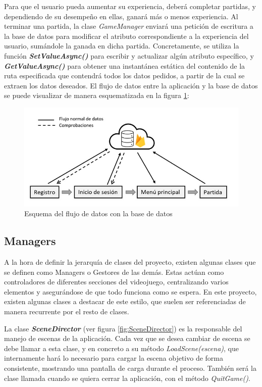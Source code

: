 Para que el usuario pueda aumentar su experiencia, deberá completar partidas, y dependiendo de su desempeño en ellas, ganará más o menos experiencia. Al terminar una partida, la clase \textit{GameManager} enviará una petición de escritura a la base de datos para modificar el atributo correspondiente a la experiencia del usuario, sumándole la ganada en dicha partida.
Concretamente, se utiliza la función \textbf{\textit{SetValueAsync()}} para escribir y actualizar algún atributo específico, y \textbf{\textit{GetValueAsync()}} para obtener una instantánea estática del contenido de la ruta especificada que contendrá todos los datos pedidos, a partir de la cual se extraen los datos deseados.
El flujo de datos entre la aplicación y la base de datos se puede visualizar de manera esquematizada en la figura \ref{fig:EsquemaBBDD}:
\begin{figure}[h]
	\centering
	\includegraphics[scale=0.45]{img/DataFlowDiagram.jpg}
	\caption{Esquema del flujo de datos con la base de datos}
	\label{fig:EsquemaBBDD}
    \end{figure}
\subsection{Managers}
A la hora de definir la jerarquía de clases del proyecto, existen algunas clases que se definen como Managers o Gestores de las demás. Estas actúan como controladores de diferentes secciones del videojuego, centralizando varios elementos y asegurándose de que todo funciona como se espera. En este proyecto, existen algunas clases a destacar de este estilo, que suelen ser referenciadas de manera recurrente por el resto de clases.

La clase \textbf{\textit{SceneDirector}} (ver figura \ref{fig:SceneDirector}) es la responsable del manejo de escenas de la aplicación. Cada vez que se desea cambiar de escena se debe llamar a esta clase, y en concreto a su método \textit{LoadScene(escena)}, que internamente hará lo necesario para cargar la escena objetivo de forma consistente, mostrando una pantalla de carga durante el proceso. También será la clase llamada cuando se quiera cerrar la aplicación, con el método \textit{QuitGame()}.

